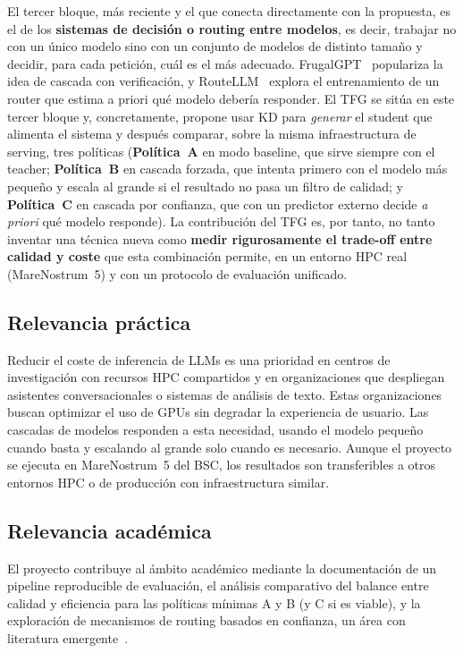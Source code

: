 El tercer bloque, más reciente y el que conecta directamente con la propuesta, es el de los \textbf{sistemas de decisión o routing entre modelos}, es decir, trabajar no con un único modelo sino con un conjunto de modelos de distinto tamaño y decidir, para cada petición, cuál es el más adecuado. FrugalGPT~\cite{chen2023frugalgpt} populariza la idea de cascada con verificación, y RouteLLM~\cite{dekoninck2024routing} explora el entrenamiento de un router que estima a priori qué modelo debería responder. El TFG se sitúa en este tercer bloque y, concretamente, propone usar KD para \emph{generar} el student que alimenta el sistema y después comparar, sobre la misma infraestructura de serving, tres políticas (\textbf{Política~A} en modo baseline, que sirve siempre con el teacher; \textbf{Política~B} en cascada forzada, que intenta primero con el modelo más pequeño y escala al grande si el resultado no pasa un filtro de calidad; y \textbf{Política~C} en cascada por confianza, que con un predictor externo decide \textit{a priori} qué modelo responde). La contribución del TFG es, por tanto, no tanto inventar una técnica nueva como \textbf{medir rigurosamente el trade-off entre calidad y coste} que esta combinación permite, en un entorno HPC real (MareNostrum~5) y con un protocolo de evaluación unificado.

\subsection{Relevancia práctica}

Reducir el coste de inferencia de LLMs es una prioridad en centros de investigación con recursos HPC compartidos y en organizaciones que despliegan asistentes conversacionales o sistemas de análisis de texto. Estas organizaciones buscan optimizar el uso de GPUs sin degradar la experiencia de usuario. Las cascadas de modelos responden a esta necesidad, usando el modelo pequeño cuando basta y escalando al grande solo cuando es necesario. Aunque el proyecto se ejecuta en MareNostrum~5 del BSC, los resultados son transferibles a otros entornos HPC o de producción con infraestructura similar.

\subsection{Relevancia académica}

El proyecto contribuye al ámbito académico mediante la documentación de un pipeline reproducible de evaluación, el análisis comparativo del balance entre calidad y eficiencia para las políticas mínimas A y B (y C si es viable), y la exploración de mecanismos de routing basados en confianza, un área con literatura emergente~\cite{chen2023frugalgpt, dekoninck2024routing}.

